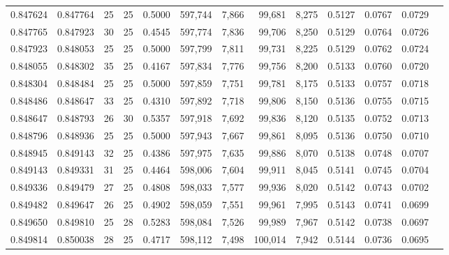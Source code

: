 \begin{tabular}{rrrrrrrrrrrrr}
0.847624 & 0.847764 &    25 &  25 &                                     0.5000 & 597,744 &   7,866 &  99,681 &   8,275 & 0.5127 & 0.0767 & 0.0729 \\
0.847765 & 0.847923 &    30 &  25 &                                     0.4545 & 597,774 &   7,836 &  99,706 &   8,250 & 0.5129 & 0.0764 & 0.0726 \\
0.847923 & 0.848053 &    25 &  25 &                                     0.5000 & 597,799 &   7,811 &  99,731 &   8,225 & 0.5129 & 0.0762 & 0.0724 \\
0.848055 & 0.848302 &    35 &  25 &                                     0.4167 & 597,834 &   7,776 &  99,756 &   8,200 & 0.5133 & 0.0760 & 0.0720 \\
0.848304 & 0.848484 &    25 &  25 &                                     0.5000 & 597,859 &   7,751 &  99,781 &   8,175 & 0.5133 & 0.0757 & 0.0718 \\
0.848486 & 0.848647 &    33 &  25 &                                     0.4310 & 597,892 &   7,718 &  99,806 &   8,150 & 0.5136 & 0.0755 & 0.0715 \\
0.848647 & 0.848793 &    26 &  30 &                                     0.5357 & 597,918 &   7,692 &  99,836 &   8,120 & 0.5135 & 0.0752 & 0.0713 \\
0.848796 & 0.848936 &    25 &  25 &                                     0.5000 & 597,943 &   7,667 &  99,861 &   8,095 & 0.5136 & 0.0750 & 0.0710 \\
0.848945 & 0.849143 &    32 &  25 &                                     0.4386 & 597,975 &   7,635 &  99,886 &   8,070 & 0.5138 & 0.0748 & 0.0707 \\
0.849143 & 0.849331 &    31 &  25 &                                     0.4464 & 598,006 &   7,604 &  99,911 &   8,045 & 0.5141 & 0.0745 & 0.0704 \\
0.849336 & 0.849479 &    27 &  25 &                                     0.4808 & 598,033 &   7,577 &  99,936 &   8,020 & 0.5142 & 0.0743 & 0.0702 \\
0.849482 & 0.849647 &    26 &  25 &                                     0.4902 & 598,059 &   7,551 &  99,961 &   7,995 & 0.5143 & 0.0741 & 0.0699 \\
0.849650 & 0.849810 &    25 &  28 &                                     0.5283 & 598,084 &   7,526 &  99,989 &   7,967 & 0.5142 & 0.0738 & 0.0697 \\
0.849814 & 0.850038 &    28 &  25 &                                     0.4717 & 598,112 &   7,498 & 100,014 &   7,942 & 0.5144 & 0.0736 & 0.0695 \\

\end{tabular}
